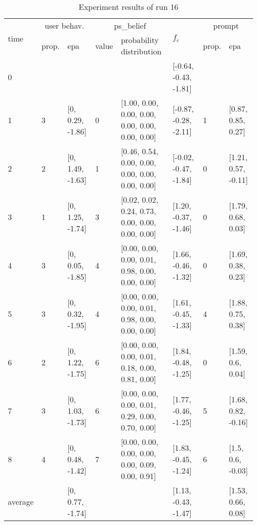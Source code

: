 \begin{table}[htbp]\footnotesize
\caption{Experiment results of run 16}
\begin{tabular}{|p{0.4cm}|p{0.6cm}|l|p{0.6cm}|p{3.3cm}|l|p{0.6cm}|l|}
\hline

\multirow{2}{*}{time} & \multicolumn{2}{c|}{user behav.} & \multicolumn{2}{c|}{ps\_belief} &
\multirow{2}{*}{$f_c$} & \multicolumn{2}{c|}{prompt} \\ \cline{2-5}\cline{ 7- 8}
& prop. & epa & value & probability distribution &  & prop. & epa \\ \hline

0 & \multicolumn{1}{l|}{} &  & \multicolumn{1}{l|}{} &  & [-0.64, -0.43, -1.81] & \multicolumn{1}{l|}{} &  \\ \hline
1 & 3 & [0, 0.29, -1.86] & 0 & [1.00, 0.00, 0.00, 0.00, 0.00, 0.00, 0.00, 0.00] & [-0.87, -0.28, -2.11] & 1 & [0.87, 0.85, 0.27] \\ \hline
2 & 2 & [0, 1.49, -1.63] & 1 & [0.46, 0.54, 0.00, 0.00, 0.00, 0.00, 0.00, 0.00] & [-0.02, -0.47, -1.84] & 0 & [1.21, 0.57, -0.11] \\ \hline
3 & 1 & [0, 1.25, -1.74] & 3 & [0.02, 0.02, 0.24, 0.73, 0.00, 0.00, 0.00, 0.00] & [1.20, -0.37, -1.46] & 0 & [1.79, 0.68, 0.03] \\ \hline
4 & 3 & [0, 0.05, -1.85] & 4 & [0.00, 0.00, 0.00, 0.01, 0.98, 0.00, 0.00, 0.00] & [1.66, -0.46, -1.32] & 0 & [1.69, 0.38, 0.23] \\ \hline
5 & 3 & [0, 0.32, -1.95] & 4 & [0.00, 0.00, 0.00, 0.01, 0.98, 0.00, 0.00, 0.00] & [1.61, -0.45, -1.33] & 4 & [1.88, 0.75, 0.38] \\ \hline
6 & 2 & [0, 1.22, -1.75] & 6 & [0.00, 0.00, 0.00, 0.01, 0.18, 0.00, 0.81, 0.00] & [1.84, -0.48, -1.25] & 0 & [1.59, 0.6, 0.04] \\ \hline
7 & 3 & [0, 1.03, -1.73] & 6 & [0.00, 0.00, 0.00, 0.01, 0.29, 0.00, 0.70, 0.00] & [1.77, -0.46, -1.25] & 5 & [1.68, 0.82, -0.16] \\ \hline
8 & 4 & [0, 0.48, -1.42] & 7 & [0.00, 0.00, 0.00, 0.00, 0.00, 0.09, 0.00, 0.91] & [1.83, -0.45, -1.24] & 6 & [1.5, 0.6, -0.03] \\ \hline
\multicolumn{1}{|l|}{average} & \multicolumn{1}{l|}{} & [0, 0.77, -1.74] & \multicolumn{1}{l|}{} &  & [1.13, -0.43, -1.47] & \multicolumn{1}{l|}{} & [1.53, 0.66, 0.08] \\ \hline
\end{tabular}
\label{}
\end{table}


